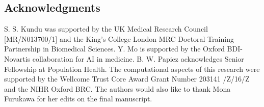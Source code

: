 \documentclass{article}
\begin{document}


\printendnotes


\subsection*{Acknowledgments}
S. S. Kundu was supported by the UK Medical Research Council
[MR/N013700/1] and the King’s College London MRC Doctoral Training Partnership
in Biomedical Sciences. Y. Mo is supported by the Oxford BDI-Novartis collaboration for AI in medicine. B. W. Papiez acknowledges Senior Fellowship at Population Health. The computational aspects of this research were supported by the Wellcome
Trust Core Award Grant Number 203141 /Z/16/Z and the NIHR Oxford BRC. The authors would also like to thank Mona Furukawa for her edits on the final manuscript.







\end{document}
